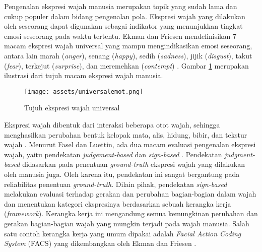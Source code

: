 \documentclass[review,3p,12pt,times]{elsarticle}
\begin{document}
Pengenalan ekspresi wajah manusia merupakan topik yang sudah lama dan cukup populer dalam bidang pengenalan pola. Ekspresi wajah yang dilakukan oleh seseorang dapat digunakan sebagai indikator yang menunjukkan tingkat emosi seseorang pada waktu tertentu. Ekman dan Friesen mendefinisikan 7 macam ekspresi wajah universal yang mampu mengindikasikan emosi seseorang, antara lain marah (\textit{anger}), senang (\textit{happy}), sedih (\textit{sadness}), jijik (\textit{disgust}), takut (\textit{fear}), terkejut (\textit{surprise}), dan meremehkan (\textit{contempt}) \cite{ekman1971constants}. Gambar \ref{fig:universalemot} merupakan ilustrasi dari tujuh macam ekspresi wajah manusia.

\begin{figure}[hbt!]
\caption{Tujuh ekspresi wajah universal}
\label{fig:universalemot}
\centering
	\texttt{[image: assets/universalemot.png]}
	
\end{figure}

Ekspresi wajah dibentuk dari interaksi beberapa otot wajah, sehingga menghasilkan perubahan bentuk kelopak mata, alis, hidung, bibir, dan tekstur wajah \cite{fasel2003automatic}. Menurut Fasel dan Luettin, ada dua macam evaluasi pengenalan ekspresi wajah, yaitu pendekatan \textit{judgement-based} dan \textit{sign-based} \cite{fasel2003automatic}. Pendekatan \textit{judgment-based} didasarkan pada penentuan \textit{ground-truth} ekspresi wajah yang dilakukan oleh manusia juga. Oleh karena itu, pendekatan ini sangat bergantung pada reliabilitas penentuan \textit{ground-truth}. Dilain pihak, pendekatan \textit{sign-based} melakukan evaluasi terhadap gerakan dan perubahan bagian-bagian dalam wajah dan menentukan kategori ekspresinya berdasarkan sebuah kerangka kerja (\textit{framework}). Kerangka kerja ini mengandung semua kemungkinan perubahan dan gerakan bagian-bagian wajah yang mungkin terjadi pada wajah manusia. Salah satu contoh kerangka kerja yang umum dipakai adalah \textit{Facial Action Coding System} (FACS) yang dikembangkan oleh Ekman dan Friesen \cite{ekman1977facial}.
\end{document}
